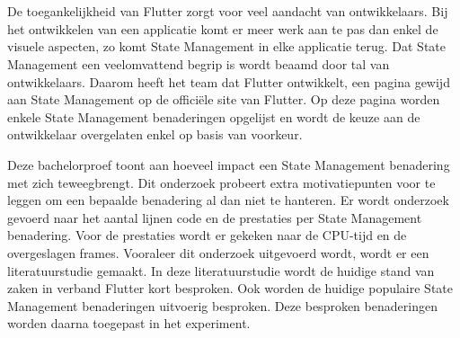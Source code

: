 
%
%



\chapter*{}
De toegankelijkheid van Flutter zorgt voor veel aandacht van ontwikkelaars. Bij het ontwikkelen van een applicatie komt er meer werk aan te pas dan enkel de visuele aspecten, zo komt State Management in elke applicatie terug. Dat State Management een veelomvattend begrip is wordt beaamd door tal van ontwikkelaars. Daarom heeft het team dat Flutter ontwikkelt, een pagina gewijd aan State Management op de officiële site van Flutter. Op deze pagina worden enkele State Management benaderingen opgelijst en wordt de keuze aan de ontwikkelaar overgelaten enkel op basis van voorkeur.\newline 

Deze bachelorproef toont aan hoeveel impact een State Management benadering met zich teweegbrengt. Dit onderzoek probeert extra motivatiepunten voor te leggen om een bepaalde benadering al dan niet te hanteren. Er wordt onderzoek gevoerd naar het aantal lijnen code en de prestaties per State Management benadering. Voor de prestaties wordt er gekeken naar de CPU-tijd en de overgeslagen frames.
\newline
Vooraleer dit onderzoek uitgevoerd wordt, wordt er een literatuurstudie gemaakt. In deze literatuurstudie wordt de huidige stand van zaken in verband Flutter kort besproken. Ook worden de huidige populaire State Management benaderingen uitvoerig besproken. Deze besproken benaderingen worden daarna toegepast in het experiment. \newline 

